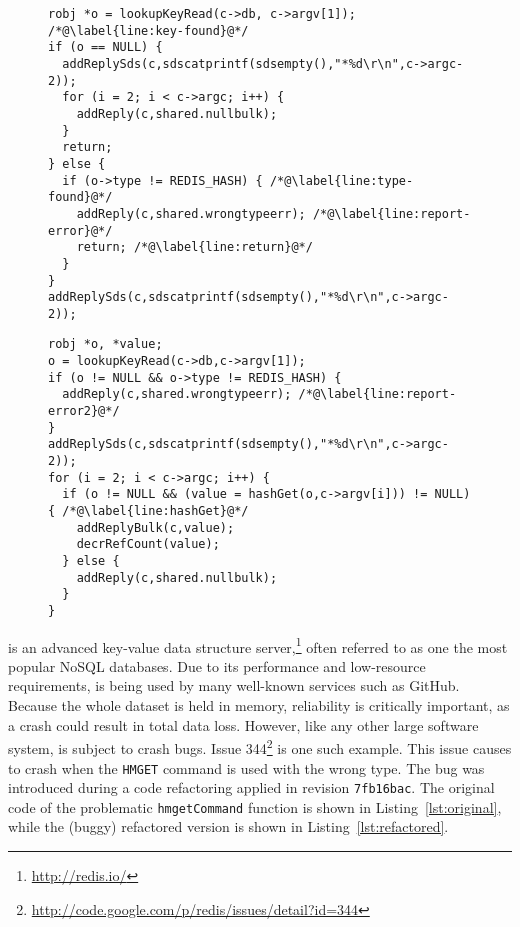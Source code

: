 \begin{figure}[t]
\begin{minipage}[b]{0.90\columnwidth}
\begin{lstlisting}[label=lst:original, caption={Original (correct) version of the {\footnotesize \texttt{hmgetCommand}} function in \redis.}]
robj *o = lookupKeyRead(c->db, c->argv[1]); /*@\label{line:key-found}@*/
if (o == NULL) {
  addReplySds(c,sdscatprintf(sdsempty(),"*%d\r\n",c->argc-2));
  for (i = 2; i < c->argc; i++) {
    addReply(c,shared.nullbulk);
  }
  return;
} else {
  if (o->type != REDIS_HASH) { /*@\label{line:type-found}@*/
    addReply(c,shared.wrongtypeerr); /*@\label{line:report-error}@*/
    return; /*@\label{line:return}@*/
  }
}
addReplySds(c,sdscatprintf(sdsempty(),"*%d\r\n",c->argc-2));
\end{lstlisting}
\end{minipage}
\hspace{2.2\columnsep}
\begin{minipage}[b]{0.9\columnwidth}
\begin{lstlisting}[label=lst:refactored, caption={Refactored (buggy) version of the {\footnotesize \texttt{hmgetCommand}} function in \redis.}]
robj *o, *value;
o = lookupKeyRead(c->db,c->argv[1]);
if (o != NULL && o->type != REDIS_HASH) {
  addReply(c,shared.wrongtypeerr); /*@\label{line:report-error2}@*/
}
addReplySds(c,sdscatprintf(sdsempty(),"*%d\r\n",c->argc-2));
for (i = 2; i < c->argc; i++) {
  if (o != NULL && (value = hashGet(o,c->argv[i])) != NULL) { /*@\label{line:hashGet}@*/
    addReplyBulk(c,value);
    decrRefCount(value);
  } else {
    addReply(c,shared.nullbulk);
  }
}
\end{lstlisting}
\end{minipage}
\end{figure}

\redis is an advanced key-value data structure
server,\footnote{\url{http://redis.io/}} often referred to as one the most
popular NoSQL databases.  Due to its performance and low-resource requirements,
\redis is being used by many well-known services such as GitHub.  Because the
whole dataset is held in memory, reliability is critically important, as a
crash could result in total data loss.  However, like any other large software
system, \redis is subject to crash bugs. Issue
344\footnote{\url{http://code.google.com/p/redis/issues/detail?id=344}} is one
such example.  This issue causes \redis to crash when the \lstinline`HMGET`
command is used with the wrong type.  The bug was introduced during a code
refactoring applied in revision \texttt{7fb16bac}.  The original code of the
problematic \lstinline`hmgetCommand` function is shown in
Listing~\ref{lst:original}, while the (buggy) refactored version is shown in
Listing~\ref{lst:refactored}.

